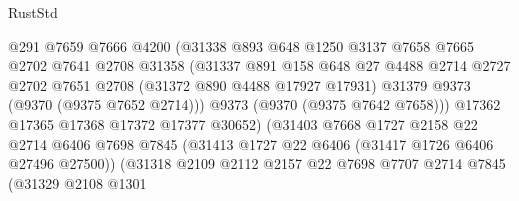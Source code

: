 \begin{lexlean}{RustStd}
\begin{coremodule}
{\begin{coremodule}
{{{{{{{{{{{{{{{{{{{{{{{{{{{{{{{{{{{{{{{                                  @291
                                  @7659
                                  @7666
                                  @4200
                                  (@31338
                                    @893
                                    @648
                                    @1250
                                    @3137
                                    @7658
                                    @7665
                                    @2702
                                    @7641
                                    @2708
                                    @31358
                                    (@31337
                                      @891
                                      @158
                                      @648
                                      @27
                                      @4488
                                      @2714
                                      @2727
                                      @2702
                                      @7651
                                      @2708
                                      (@31372 @890 @4488 @17927 @17931)
                                      @31379
                                      @9373
                                      (@9370 (@9375 @7652 @2714)))
                                    @9373
                                    (@9370 (@9375 @7642 @7658)))
                                  @17362
                                  @17365
                                  @17368
                                  @17372
                                  @17377
                                  @30652)
                                (@31403
                                  @7668
                                  @1727
                                  @2158
                                  @22
                                  @2714
                                  @6406
                                  @7698
                                  @7845
                                  (@31413 @1727 @22 @6406 (@31417 @1726 @6406 @27496 @27500))
                                  (@31318
                                    @2109
                                    @2112
                                    @2157
                                    @22
                                    @7698
                                    @7707
                                    @2714
                                    @7845
                                    (@31329
                                      @2108
                                      @1301
}}}}}}}}}}}}}}}}}}}}}}}}}}}}}}}}}}}}}}}
\end{coremodule}}
\end{coremodule}
\end{lexlean}
